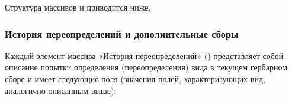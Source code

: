 \documentclass[letterpaper,10pt,russian]{sphinxmanual}
\begin{document}
Структура массивов  и  приводится ниже.

\ignorespaces 

\subsubsection{История переопределений и дополнительные сборы}
\label{\detokenize{http_api:id11}}\label{\detokenize{http_api:index-4}}

Каждый элемент массива «История переопределений» () представляет собой описание
попытки определения (переопределения) вида в текущем гербарном сборе и имеет
следующие поля (значения полей, характеризующих вид, аналогично описанным выше):
\end{document}

